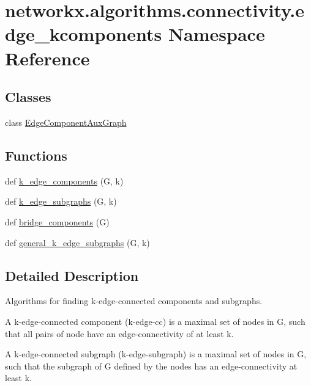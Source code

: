 \hypertarget{namespacenetworkx_1_1algorithms_1_1connectivity_1_1edge__kcomponents}{}\section{networkx.\+algorithms.\+connectivity.\+edge\+\_\+kcomponents Namespace Reference}
\label{namespacenetworkx_1_1algorithms_1_1connectivity_1_1edge__kcomponents}
\subsection*{Classes}
\begin{DoxyCompactItemize}
\item 
class \hyperlink{classnetworkx_1_1algorithms_1_1connectivity_1_1edge__kcomponents_1_1EdgeComponentAuxGraph}{Edge\+Component\+Aux\+Graph}
\end{DoxyCompactItemize}
\subsection*{Functions}
\begin{DoxyCompactItemize}
\item 
def \hyperlink{namespacenetworkx_1_1algorithms_1_1connectivity_1_1edge__kcomponents_af6249ee7fb8d09fe3f506cdf57b5e8e3}{k\+\_\+edge\+\_\+components} (G, k)
\item 
def \hyperlink{namespacenetworkx_1_1algorithms_1_1connectivity_1_1edge__kcomponents_ac157f85d3e68bf00257d29488f8c795e}{k\+\_\+edge\+\_\+subgraphs} (G, k)
\item 
def \hyperlink{namespacenetworkx_1_1algorithms_1_1connectivity_1_1edge__kcomponents_a37f92268daf27cb5c79593656e3c5958}{bridge\+\_\+components} (G)
\item 
def \hyperlink{namespacenetworkx_1_1algorithms_1_1connectivity_1_1edge__kcomponents_a37593586a0ba623692e0b34dae6a6cb8}{general\+\_\+k\+\_\+edge\+\_\+subgraphs} (G, k)
\end{DoxyCompactItemize}


\subsection{Detailed Description}
\begin{DoxyVerb}Algorithms for finding k-edge-connected components and subgraphs.

A k-edge-connected component (k-edge-cc) is a maximal set of nodes in G, such
that all pairs of node have an edge-connectivity of at least k.

A k-edge-connected subgraph (k-edge-subgraph) is a maximal set of nodes in G,
such that the subgraph of G defined by the nodes has an edge-connectivity at
least k.
\end{DoxyVerb}
 

